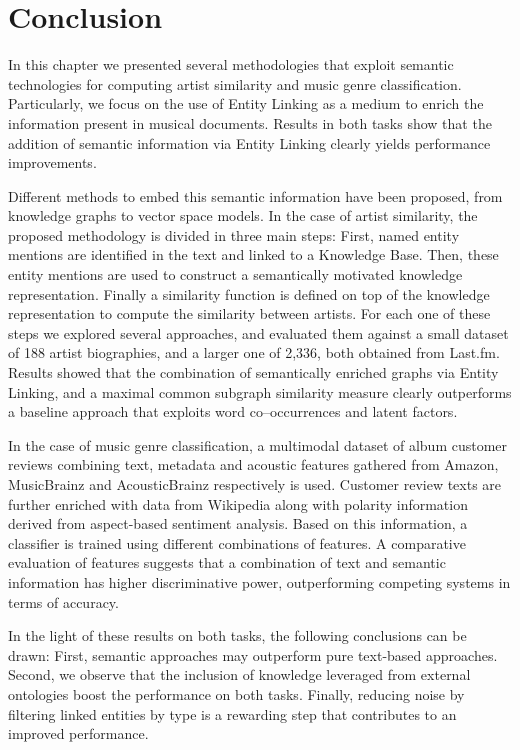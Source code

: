 \section{Conclusion}
\label{sec:similarity:conclusion}

In this chapter we presented several methodologies that exploit semantic technologies for computing artist similarity and music genre classification. Particularly, we focus on the use of Entity Linking as a medium to enrich the information present in musical documents. Results in both tasks show that the addition of semantic information via Entity Linking clearly yields performance improvements.

Different methods to embed this semantic information have been proposed, from knowledge graphs to vector space models.
In the case of artist similarity, the proposed methodology is divided in three main steps: First, named entity mentions are identified in the text and linked to a Knowledge Base. Then, these entity mentions are used to construct a semantically motivated knowledge representation. Finally a similarity function is defined on top of the knowledge representation to compute the similarity between artists.
For each one of these steps we explored several approaches, and evaluated them against a small dataset of 188 artist biographies, and a larger one of 2,336, both obtained from Last.fm.
Results showed that the combination of semantically enriched graphs via Entity Linking, and a maximal common subgraph similarity measure clearly outperforms a baseline approach that exploits word co--occurrences and latent factors.

In the case of music genre classification, a multimodal dataset of album customer reviews combining text, metadata and acoustic features gathered from Amazon, MusicBrainz and AcousticBrainz respectively is used. Customer review texts are further enriched with data from Wikipedia along with polarity information derived from aspect-based sentiment analysis. Based on this information, a classifier is trained using different combinations of features. 
A comparative evaluation of features suggests that a combination of text and semantic information has higher discriminative power, outperforming competing systems in terms of accuracy.

In the light of these results on both tasks, the following conclusions can be drawn: First, semantic approaches may outperform pure text-based approaches. Second, we observe that the inclusion of knowledge leveraged from external ontologies boost the performance on both tasks. Finally, reducing noise by filtering linked entities by type is a rewarding step that contributes to an improved performance.
